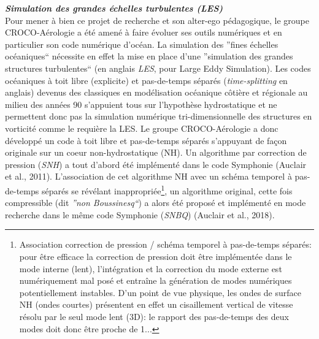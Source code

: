 \documentclass[a4paper,11pt]{report}
\begin{document}
\noindent \textit{\textbf{Simulation des grandes échelles turbulentes (LES)}}\\
Pour mener à bien ce projet de recherche et son alter-ego pédagogique, le groupe CROCO-Aérologie a été amené à faire évoluer ses outils numériques et en particulier son code numérique d'océan. La simulation des ''fines échelles océaniques`` nécessite en effet la mise en place d'une ''simulation des grandes structures turbulentes`` (en anglais \textit{LES}, pour Large Eddy Simulation). Les codes océaniques à toit libre (explicite) et pas-de-temps séparés (\textit{time-splitting} en anglais) devenus des classiques en modélisation océanique côtière et régionale au milieu des années 90 s'appuient tous sur l'hypothèse hydrostatique et ne permettent donc pas la simulation numérique tri-dimensionnelle des structures en vorticité comme le requière la LES. Le groupe CROCO-Aérologie a donc développé un code à toit libre et pas-de-temps séparés s'appuyant de façon originale sur un coeur non-hydrostatique (NH). Un algorithme par correction de pression (\textit{SNH}) a tout d'abord été implémenté dans le code Symphonie (Auclair et al., 2011). L'association de cet algorithme NH avec un schéma temporel à pas-de-temps séparés se révélant inappropriée\footnote{Association correction de pression / schéma temporel à pas-de-temps séparés: pour être efficace la correction de pression doit être implémentée dans le mode interne (lent), l'intégration et la correction du mode externe est numériquement mal posé et entraîne la génération de modes numériques potentiellement instables. D'un point de vue physique, les ondes de surface NH (ondes courtes) présentent en effet un cisaillement vertical de vitesse résolu par le seul mode lent (3D): le rapport des pas-de-temps des deux modes doit donc être proche de 1...}, un algorithme original, cette fois compressible (dit \textit{''non Boussinesq``}) a alors été proposé et implémenté en mode recherche dans le même code Symphonie (\textit{SNBQ}) (Auclair et al., 2018). \\
\end{document}
